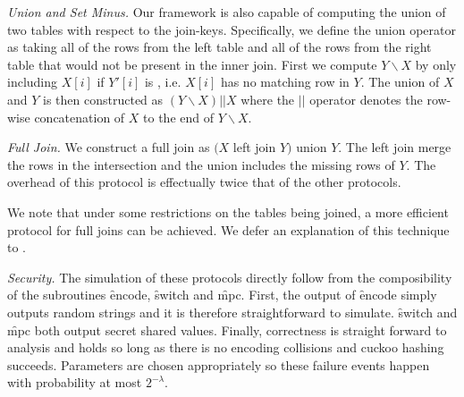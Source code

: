 \emph{Union and Set Minus.}
Our framework is also capable of computing the union of two tables with respect to the join-keys. Specifically, we define the union operator as taking all of the rows from the left table and all of the rows from the right table that would not be present in the inner join. First we compute $Y\backslash X$ by only including $X[i]$ if $Y'[i]$ is \Null, i.e. $X[i]$ has no matching row in $Y$. The union of $X$ and $Y$ is then constructed as $(Y\backslash X) || X$ where the $||$ operator denotes the row-wise concatenation of $X$ to the end of $Y\backslash X$.


\emph{Full Join.}
We construct a full join as $(X$ left join $Y)$ union $Y$. The left join merge the rows in the intersection and the union includes the missing rows of $Y$. The overhead of this protocol is effectually twice that of the other protocols. 

We note that under some restrictions on the tables being joined, a more efficient protocol for full joins can be achieved. We defer an explanation of this technique to .

\emph{Security.} The simulation of these protocols directly follow from the composibility of the subroutines \f{encode}, \f{switch} and \f{mpc}. First, the output of \f{encode} simply outputs random strings and it is therefore straightforward to simulate.  \f{switch} and \f{mpc} both output secret shared values. Finally, correctness is straight forward to analysis and holds so long as there is no encoding collisions and cuckoo hashing succeeds. Parameters are chosen appropriately so these failure events happen with probability at most $2^{-\lambda}$.

